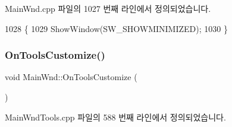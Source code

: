 Main\+Wnd.\+cpp 파일의 1027 번째 라인에서 정의되었습니다.


\begin{DoxyCode}
1028 \{
1029   ShowWindow(SW\_SHOWMINIMIZED);
1030 \}
\end{DoxyCode}
\mbox{\label{class_main_wnd_a37f9cc51f47fe32648f937b8ff64e955}} 
\subsubsection{\texorpdfstring{On\+Tools\+Customize()}{OnToolsCustomize()}}
{\footnotesize\ttfamily void Main\+Wnd\+::\+On\+Tools\+Customize (\begin{DoxyParamCaption}{ }\end{DoxyParamCaption})\hspace{0.3cm}{\ttfamily [protected]}}



Main\+Wnd\+Tools.\+cpp 파일의 588 번째 라인에서 정의되었습니다.


